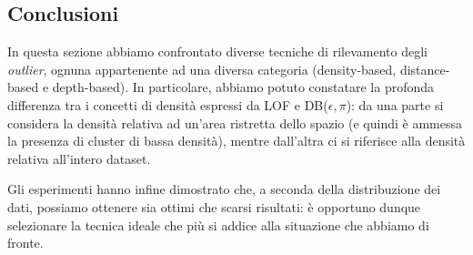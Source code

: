 \documentclass[a4paper]{article}
\begin{document}
\subsection{Conclusioni}

In questa sezione abbiamo confrontato diverse tecniche di rilevamento degli \textit{outlier}, ognuna appartenente ad una diversa categoria (density-based, distance-based e depth-based). In particolare, abbiamo potuto constatare la profonda differenza tra i concetti di densità espressi da LOF e DB($\epsilon,\pi$): da una parte si considera la densità relativa ad un'area ristretta dello spazio (e quindi è ammessa la presenza di cluster di bassa densità), mentre dall'altra ci si riferisce alla densità relativa all'intero dataset. 

Gli esperimenti hanno infine dimostrato che, a seconda della distribuzione dei dati, possiamo ottenere sia ottimi che scarsi risultati: è opportuno dunque selezionare la tecnica ideale che più si addice alla situazione che abbiamo di fronte.

 

\end{document}

